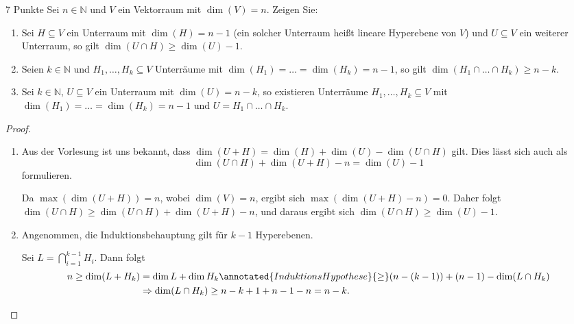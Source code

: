 \documentclass{problemset}
\begin{document}
\begin{problem}{7 Punkte}
Sei $n \in \mathbb{N}$ und $V$ ein Vektorraum mit $\dim(V) = n$. Zeigen Sie:
\begin{enumerate}
	\item Sei $H \subseteq V$ ein Unterraum mit $\dim(H) = n - 1$ (ein solcher Unterraum heißt lineare Hyperebene von $V$) und $U \subseteq V$ ein weiterer Unterraum, so gilt $\dim(U \cap H) \geq \dim(U) - 1$.
	\item Seien $k \in \mathbb{N}$ und $H_1, \ldots, H_k \subseteq V$ Unterräume mit $\dim(H_1) = \ldots = \dim(H_k) = n - 1$, so gilt $\dim(H_1 \cap \ldots \cap H_k) \geq n - k$.
	\item Sei $k \in \mathbb{N}$, $U \subseteq V$ ein Unterraum mit $\dim(U) = n - k$, so existieren Unterräume $H_1, \ldots, H_k \subseteq V$ mit $\dim(H_1) = \ldots = \dim(H_k) = n - 1$ und $U = H_1 \cap \ldots \cap H_k$.
\end{enumerate}

\begin{proof}
	$ $
	\begin{enumerate}
		\item Aus der Vorlesung ist uns bekannt, dass $\dim(U+H) = \dim(H) + \dim(U) - \dim(U \cap H)$ gilt.
		      Dies lässt sich auch als \[
			      \dim(U \cap H) + \dim(U + H) - n = \dim(U) - 1
		      \] formulieren.

		      Da $\max(\dim(U + H)) = n$, wobei $\dim(V) = n$, ergibt sich $\max(\dim(U + H) - n) = 0$.
		      Daher folgt $\dim(U \cap H) \ge \dim(U \cap H) + \dim(U + H) - n$, und daraus ergibt sich $\dim(U \cap H) \geq \dim(U) - 1$.

		\item Angenommen, die Induktionsbehauptung gilt für $k-1$ Hyperebenen.

		      Sei $L = \bigcap_{i=1}^{k-1} H_i$. Dann folgt
		      \begin{align*}
			      n \ge \dim(L + H_k) & = \dim L + \dim H_k \annotated{Induktions Hypothese}{\ge} (n - (k-1)) + (n-1) - \dim(L \cap H_k) \\
			                          & \Rightarrow \dim(L \cap H_k) \ge n - k + 1 + n - 1 - n = n - k.
		      \end{align*}

	\end{enumerate}
\end{proof}
\end{problem}
\end{document}
